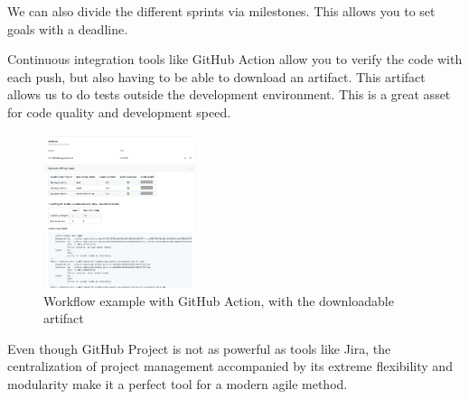 We can also divide the different sprints via milestones.
This allows you to set goals with a deadline.


\newpage

Continuous integration tools like GitHub Action allow you to verify the code with each push,
but also having to be able to download an artifact.
This artifact allows us to do tests outside the development environment.
This is a great asset for code quality and development speed.


\begin{figure}[H]
    \centering
    \includegraphics[width=0.4\textwidth]{img/GitHubAction}
    \caption{Workflow example with GitHub Action, with the downloadable artifact}
    \label{fig:GitHubAction}
\end{figure}


Even though GitHub Project is not as powerful as tools like Jira,
the centralization of project management accompanied by its extreme flexibility and modularity make it a perfect tool
for a modern agile method.
